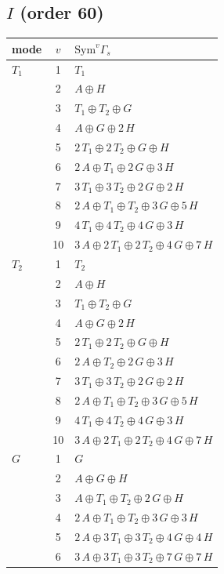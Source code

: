 \documentclass[11pt]{article}
\begin{document}
\subsection*{$I$ \quad (order 60)}
\begin{longtable}{l c p{}}
\hline mode & $v$ & $\mathrm{Sym}^v\Gamma_s$\\ \hline\endhead
$T_{1}$ & 1 & $T_{1}$\\
 & 2 & $A\oplus H$\\
 & 3 & $T_{1}\oplus T_{2}\oplus G$\\
 & 4 & $A\oplus G\oplus 2\,H$\\
 & 5 & $2\,T_{1}\oplus 2\,T_{2}\oplus G\oplus H$\\
 & 6 & $2\,A\oplus T_{1}\oplus 2\,G\oplus 3\,H$\\
 & 7 & $3\,T_{1}\oplus 3\,T_{2}\oplus 2\,G\oplus 2\,H$\\
 & 8 & $2\,A\oplus T_{1}\oplus T_{2}\oplus 3\,G\oplus 5\,H$\\
 & 9 & $4\,T_{1}\oplus 4\,T_{2}\oplus 4\,G\oplus 3\,H$\\
 & 10 & $3\,A\oplus 2\,T_{1}\oplus 2\,T_{2}\oplus 4\,G\oplus 7\,H$\\
\hline
$T_{2}$ & 1 & $T_{2}$\\
 & 2 & $A\oplus H$\\
 & 3 & $T_{1}\oplus T_{2}\oplus G$\\
 & 4 & $A\oplus G\oplus 2\,H$\\
 & 5 & $2\,T_{1}\oplus 2\,T_{2}\oplus G\oplus H$\\
 & 6 & $2\,A\oplus T_{2}\oplus 2\,G\oplus 3\,H$\\
 & 7 & $3\,T_{1}\oplus 3\,T_{2}\oplus 2\,G\oplus 2\,H$\\
 & 8 & $2\,A\oplus T_{1}\oplus T_{2}\oplus 3\,G\oplus 5\,H$\\
 & 9 & $4\,T_{1}\oplus 4\,T_{2}\oplus 4\,G\oplus 3\,H$\\
 & 10 & $3\,A\oplus 2\,T_{1}\oplus 2\,T_{2}\oplus 4\,G\oplus 7\,H$\\
\hline
$G$ & 1 & $G$\\
 & 2 & $A\oplus G\oplus H$\\
 & 3 & $A\oplus T_{1}\oplus T_{2}\oplus 2\,G\oplus H$\\
 & 4 & $2\,A\oplus T_{1}\oplus T_{2}\oplus 3\,G\oplus 3\,H$\\
 & 5 & $2\,A\oplus 3\,T_{1}\oplus 3\,T_{2}\oplus 4\,G\oplus 4\,H$\\
 & 6 & $3\,A\oplus 3\,T_{1}\oplus 3\,T_{2}\oplus 7\,G\oplus 7\,H$\\

\end{longtable}
\end{document}
